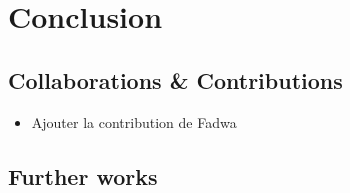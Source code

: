 \chapter{Conclusion} %
\label{cha:conclusion}

\section{Collaborations \& Contributions} %
\label{sec:collaborations_&_contributions}

\begin{itemize}
	\item Ajouter la contribution de Fadwa
\end{itemize}


\section{Further works} %
\label{sec:further_works}

\lipsum


